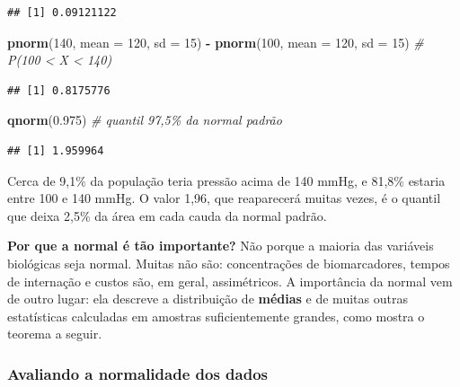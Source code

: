 \documentclass[
]{book}
\newenvironment{Shaded}{\begin{snugshade}}{\end{snugshade}}
\newcommand{\AttributeTok}[1]{\textcolor[rgb]{0.13,0.29,0.53}{#1}}
\newcommand{\CommentTok}[1]{\textcolor[rgb]{0.56,0.35,0.01}{\textit{#1}}}
\newcommand{\DecValTok}[1]{\textcolor[rgb]{0.00,0.00,0.81}{#1}}
\newcommand{\FloatTok}[1]{\textcolor[rgb]{0.00,0.00,0.81}{#1}}
\newcommand{\FunctionTok}[1]{\textcolor[rgb]{0.13,0.29,0.53}{\textbf{#1}}}
\newcommand{\NormalTok}[1]{#1}
\newcommand{\SpecialCharTok}[1]{\textcolor[rgb]{0.81,0.36,0.00}{\textbf{#1}}}
\begin{document}
\begin{verbatim}
## [1] 0.09121122
\end{verbatim}

\begin{Shaded}
\begin{Highlighting}[]
\FunctionTok{pnorm}\NormalTok{(}\DecValTok{140}\NormalTok{, }\AttributeTok{mean =} \DecValTok{120}\NormalTok{, }\AttributeTok{sd =} \DecValTok{15}\NormalTok{) }\SpecialCharTok{{-}} \FunctionTok{pnorm}\NormalTok{(}\DecValTok{100}\NormalTok{, }\AttributeTok{mean =} \DecValTok{120}\NormalTok{, }\AttributeTok{sd =} \DecValTok{15}\NormalTok{)  }\CommentTok{\# P(100 \textless{} X \textless{} 140)}
\end{Highlighting}
\end{Shaded}

\begin{verbatim}
## [1] 0.8175776
\end{verbatim}

\begin{Shaded}
\begin{Highlighting}[]
\FunctionTok{qnorm}\NormalTok{(}\FloatTok{0.975}\NormalTok{)                                                 }\CommentTok{\# quantil 97,5\% da normal padrão}
\end{Highlighting}
\end{Shaded}

\begin{verbatim}
## [1] 1.959964
\end{verbatim}

Cerca de 9,1\% da população teria pressão acima de 140 mmHg, e 81,8\% estaria entre 100 e 140 mmHg. O valor 1,96, que reaparecerá muitas vezes, é o quantil que deixa 2,5\% da área em cada cauda da normal padrão.

\textbf{Por que a normal é tão importante?} Não porque a maioria das variáveis biológicas seja normal. Muitas não são: concentrações de biomarcadores, tempos de internação e custos são, em geral, assimétricos. A importância da normal vem de outro lugar: ela descreve a distribuição de \textbf{médias} e de muitas outras estatísticas calculadas em amostras suficientemente grandes, como mostra o teorema a seguir.

\subsubsection{Avaliando a normalidade dos dados}\label{avaliando-a-normalidade-dos-dados}
\end{document}
